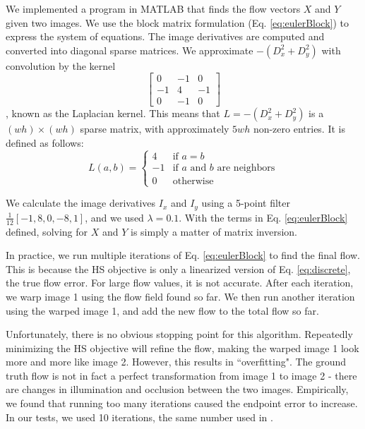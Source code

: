 \documentclass[10pt,twocolumn,letterpaper]{article}
\begin{document}
We implemented a program in MATLAB that finds the flow vectors $X$ and $Y$ given two images.  We use the block matrix formulation (Eq. \ref{eq:eulerBlock}) to express the system of equations.  The image derivatives are computed and converted into diagonal sparse matrices.  We approximate $-(D_x^2 + D_y^2)$ with convolution by the kernel
\begin{equation} \label{eq:laplacian}
\left[ \begin{array}{ccc}
0 & -1 & 0 \\
-1 & 4 & -1 \\
0 & -1 & 0
\end{array} \right]
\end{equation}
, known as the Laplacian kernel.  This means that $L = -(D_x^2 + D_y^2)$ is a $(wh) \times (wh)$ sparse matrix, with approximately $5wh$ non-zero entries.  It is defined as follows:
\begin{equation} \label{eq:laplacian2}
L(a, b) = \begin{cases}
4 & \text{if } a = b \\
-1 & \text{if $a$ and $b$ are neighbors} \\
0 & \text{otherwise}
\end{cases}
\end{equation}

We calculate the image derivatives $I_x$ and $I_y$ using a 5-point filter $\frac{1}{12}[-1, 8, 0, -8, 1]$, and we used $\lambda = 0.1$.  With the terms in Eq. \ref{eq:eulerBlock} defined, solving for $X$ and $Y$ is simply a matter of matrix inversion.

In practice, we run multiple iterations of Eq. \ref{eq:eulerBlock} to find the final flow.  This is because the HS objective is only a linearized version of Eq. \ref{eq:discrete}, the true flow error.  For large flow values, it is not accurate.  After each iteration, we warp image 1 using the flow field found so far.  We then run another iteration using the warped image 1, and add the new flow to the total flow so far.

Unfortunately, there is no obvious stopping point for this algorithm.  Repeatedly minimizing the HS objective will refine the flow, making the warped image 1 look more and more like image 2.  However, this results in ``overfitting".  The ground truth flow is not in fact a perfect transformation from image 1 to image 2 - there are changes in illumination and occlusion between the two images.  Empirically, we found that running too many iterations caused the endpoint error to increase.  In our tests, we used 10 iterations, the same number used in \cite{sun}.
\end{document}
